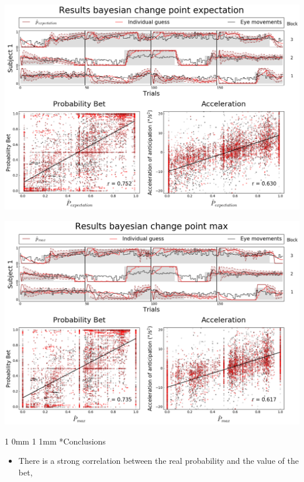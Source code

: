\documentclass[profile,final,english, draft]{sciposter}%
\makeatletter
\renewcommand{\section}{\@startsection
        {section}%
        {1}%
        {0mm}%
        {1\baselineskip}%
        {1mm}%
        {\large\color{red}\bfseries}}%
\makeatother
\begin{document}
\begin{multicols}{3}
\begin{center} 
    \includegraphics[width=1\columnwidth]{results_bayesianchangepoint_e}
\end{center}

\begin{center} 
    \includegraphics[width=1\columnwidth]{results_bayesianchangepoint_m}
\end{center}



\section*{Conclusions}


\begin{itemize}\setlength{\itemsep}{0ex}
\item There is a strong correlation between the real probability and the value of the bet,


\end{itemize}
\end{multicols}
\end{document}
